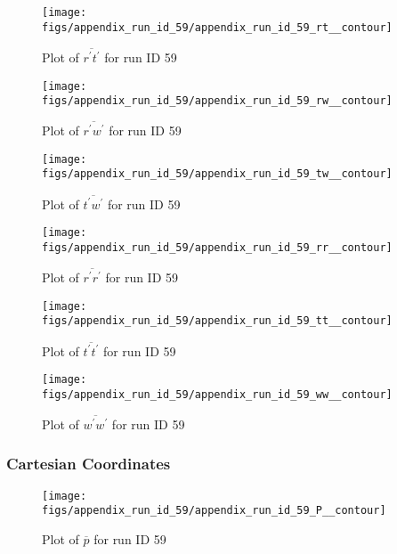 \begin{figure}[H]
\centering
\texttt{[image: figs/appendix\_run\_id\_59/appendix\_run\_id\_59\_rt\_\_contour]}
\caption{Plot of $\overline{r^\prime t^\prime}$ for run ID 59}
\label{fig:appendix_run_id_59_rt__contour}
\end{figure}


\begin{figure}[H]
\centering
\texttt{[image: figs/appendix\_run\_id\_59/appendix\_run\_id\_59\_rw\_\_contour]}
\caption{Plot of $\overline{r^\prime w^\prime}$ for run ID 59}
\label{fig:appendix_run_id_59_rw__contour}
\end{figure}


\begin{figure}[H]
\centering
\texttt{[image: figs/appendix\_run\_id\_59/appendix\_run\_id\_59\_tw\_\_contour]}
\caption{Plot of $\overline{t^\prime w^\prime}$ for run ID 59}
\label{fig:appendix_run_id_59_tw__contour}
\end{figure}


\begin{figure}[H]
\centering
\texttt{[image: figs/appendix\_run\_id\_59/appendix\_run\_id\_59\_rr\_\_contour]}
\caption{Plot of $\overline{r^\prime r^\prime}$ for run ID 59}
\label{fig:appendix_run_id_59_rr__contour}
\end{figure}


\begin{figure}[H]
\centering
\texttt{[image: figs/appendix\_run\_id\_59/appendix\_run\_id\_59\_tt\_\_contour]}
\caption{Plot of $\overline{t^\prime t^\prime}$ for run ID 59}
\label{fig:appendix_run_id_59_tt__contour}
\end{figure}


\begin{figure}[H]
\centering
\texttt{[image: figs/appendix\_run\_id\_59/appendix\_run\_id\_59\_ww\_\_contour]}
\caption{Plot of $\overline{w^\prime w^\prime}$ for run ID 59}
\label{fig:appendix_run_id_59_ww__contour}
\end{figure}


\subsubsection{Cartesian Coordinates}
\begin{figure}[H]
\centering
\texttt{[image: figs/appendix\_run\_id\_59/appendix\_run\_id\_59\_P\_\_contour]}
\caption{Plot of $\overline{p}$ for run ID 59}
\label{fig:appendix_run_id_59_P__contour}
\end{figure}


